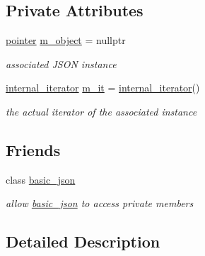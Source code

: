 \subsection*{Private Attributes}
\begin{DoxyCompactItemize}
\item 
\hyperlink{classnlohmann_1_1basic__json_1_1iter__impl_a3dddd7fa38b36e2531700ceb4a1ce9a8}{pointer} \hyperlink{classnlohmann_1_1basic__json_1_1iter__impl_a252df5be3fdd0b6aaa770b5929c7addc}{m\+\_\+object} = nullptr
\begin{DoxyCompactList}\small\item\em associated J\+S\+ON instance \end{DoxyCompactList}\item 
\hyperlink{structnlohmann_1_1basic__json_1_1internal__iterator}{internal\+\_\+iterator} \hyperlink{classnlohmann_1_1basic__json_1_1iter__impl_a15e9b7b591b09fe7945a2b41bf3de0c1}{m\+\_\+it} = \hyperlink{structnlohmann_1_1basic__json_1_1internal__iterator}{internal\+\_\+iterator}()
\begin{DoxyCompactList}\small\item\em the actual iterator of the associated instance \end{DoxyCompactList}\end{DoxyCompactItemize}
\subsection*{Friends}
\begin{DoxyCompactItemize}
\item 
class \hyperlink{classnlohmann_1_1basic__json_1_1iter__impl_ada3100cdb8700566051828f1355fa745}{basic\+\_\+json}
\begin{DoxyCompactList}\small\item\em allow \hyperlink{classnlohmann_1_1basic__json}{basic\+\_\+json} to access private members \end{DoxyCompactList}\end{DoxyCompactItemize}


\subsection{Detailed Description}
